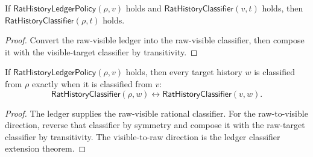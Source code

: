 \begin{theorem}
\label{thm:rat-ledger-classifier-extension}
If $\mathsf{RatHistoryLedgerPolicy}(\rho,v)$ holds and
$\mathsf{RatHistoryClassifier}(v,t)$ holds, then
$\mathsf{RatHistoryClassifier}(\rho,t)$ holds.
\end{theorem}
\begin{proof}
Convert the raw-visible ledger into the raw-visible classifier, then compose it
with the visible-target classifier by transitivity.
\end{proof}

\begin{theorem}
\label{thm:rat-history-ledger-classifier-endpoint-equivalence}
If $\mathsf{RatHistoryLedgerPolicy}(\rho,v)$ holds, then every target history
$w$ is classified from $\rho$ exactly when it is classified from $v$:
$$
\mathsf{RatHistoryClassifier}(\rho,w)\leftrightarrow
\mathsf{RatHistoryClassifier}(v,w).
$$
\end{theorem}
\begin{proof}
The ledger supplies the raw-visible rational classifier. For the raw-to-visible
direction, reverse that classifier by symmetry and compose it with the
raw-target classifier by transitivity. The visible-to-raw direction is the
ledger classifier extension theorem.
\end{proof}

